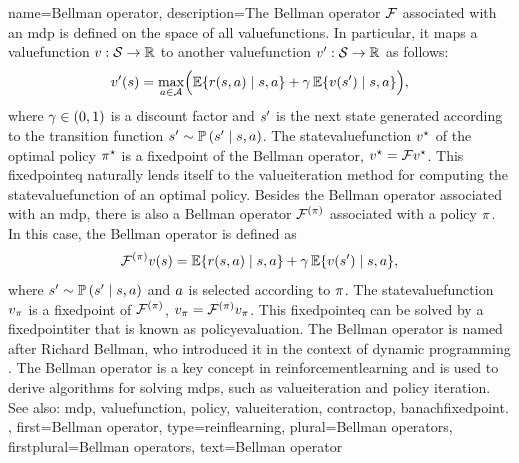 {name={Bellman operator},
	description={The Bellman \gls{operator} $\mathcal{F}$ 
		associated with an \gls{mdp} is defined on the space of all 
		\glspl{valuefunction}. In particular, it maps a 
		\gls{valuefunction} $v: \mathcal{S} \rightarrow \mathbb{R}$ 
		to another \gls{valuefunction} $v': \mathcal{S} \rightarrow \mathbb{R}$ 
		as follows:
		\[
		       	v'(s) =\max_{a \in \mathcal{A}}
			\Bigl(
			\mathbb{E}\{ r(s,a)\mid s,a \}
			+ \gamma \, \mathbb{E}\{ v(s') \mid s,a \}
			\Bigr),
		\]
		where $\gamma \in (0,1)$ is a discount factor and $s'$ is the 
		next \gls{state} generated according to the transition \gls{function} 
		$s' \sim \mathbb{P}\left(s' \mid s,a\right)$.
		The \gls{statevaluefunction} $v^\star$ of the optimal 
		\gls{policy} $\pi^\star$ is a \gls{fixedpoint} of the Bellman \gls{operator}, 
		$v^\star = \mathcal{F} v^\star$. This \gls{fixedpointeq} 
		naturally lends itself to the \gls{valueiteration} method for computing the \gls{statevaluefunction} 
		of an optimal \gls{policy}. Besides the Bellman \gls{operator} 
		associated with an \gls{mdp}, there is also a Bellman \gls{operator} 
		$\mathcal{F}^{(\pi)}$ associated with a \gls{policy} $\pi$. 
		In this case, the Bellman \gls{operator} is defined as
		\[
			\mathcal{F}^{(\pi)} v(s) = \mathbb{E}\{ r(s,a) \mid s,a \}
			+ \gamma \, \mathbb{E}\{ v(s') \mid s,a \},
		\]
		where $s' \sim \mathbb{P}\left(s' \mid s,a\right)$ and $a$ is selected
		according to $\pi$. The \gls{statevaluefunction} $v_{\pi}$ is a 
		\gls{fixedpoint} of $\mathcal{F}^{(\pi)}$, $v_{\pi}= \mathcal{F}^{(\pi)}v_{\pi}$. 
		This \gls{fixedpointeq} can be solved by a \gls{fixedpointiter} that is known as \gls{policyevaluation}. 
		The Bellman \gls{operator} is named after Richard Bellman, who introduced it in the context of
		dynamic programming \cite{Bellman1957}. The Bellman \gls{operator} is a key
		concept in \gls{reinforcementlearning} and is used to derive \glspl{algorithm} for
		solving \glspl{mdp}, such as \gls{valueiteration} and \gls{policy} \gls{iteration}\cite{SuttonEd2}.
		\\
		See also: \gls{mdp}, \gls{valuefunction}, \gls{policy}, \gls{valueiteration}, \gls{contractop}, \gls{banachfixedpoint}. }, 
	first={Bellman operator},
	type=reinflearning,
	plural={Bellman operators},
	firstplural={Bellman operators},
	text={Bellman operator}
}

